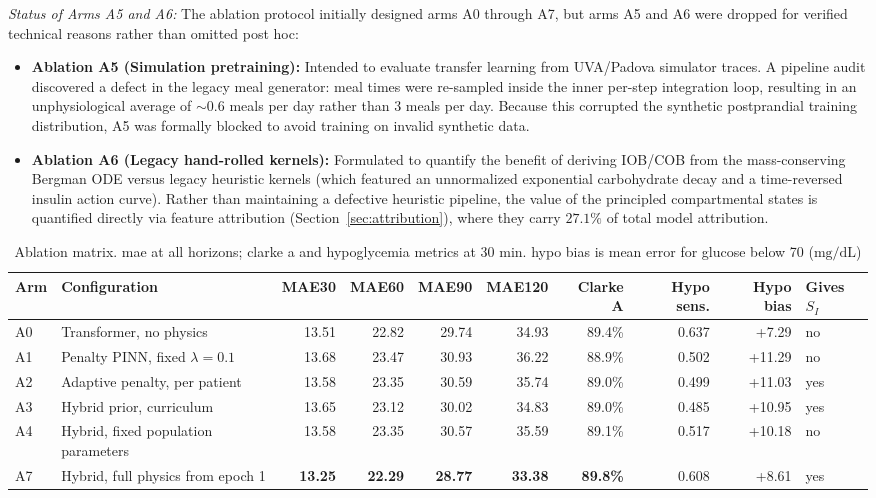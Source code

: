 \documentclass[journal]{IEEEtran}
\begin{document}
\textit{Status of Arms A5 and A6:} The ablation protocol initially designed arms A0 through A7, but arms A5 and A6 were dropped for verified technical reasons rather than omitted post hoc:
\begin{itemize}
    \item \textbf{Ablation A5 (Simulation pretraining):} Intended to evaluate transfer learning from UVA/Padova simulator traces. A pipeline audit discovered a defect in the legacy meal generator: meal times were re-sampled inside the inner per-step integration loop, resulting in an unphysiological average of $\sim 0.6$ meals per day rather than $3$ meals per day. Because this corrupted the synthetic postprandial training distribution, A5 was formally blocked to avoid training on invalid synthetic data.
    \item \textbf{Ablation A6 (Legacy hand-rolled kernels):} Formulated to quantify the benefit of deriving IOB/COB from the mass-conserving Bergman ODE versus legacy heuristic kernels (which featured an unnormalized exponential carbohydrate decay and a time-reversed insulin action curve). Rather than maintaining a defective heuristic pipeline, the value of the principled compartmental states is quantified directly via feature attribution (Section~\ref{sec:attribution}), where they carry $27.1\%$ of total model attribution.
\end{itemize}


\begin{table}[t]
\centering

\caption{Ablation matrix. mae at all horizons; clarke a and hypoglycemia metrics at 30 min. hypo bias is mean error for glucose below 70 ($\mathrm{mg/dL}$)}
\label{tab:ablation}
\footnotesize
\setlength{\tabcolsep}{4.5pt}
\begin{tabular}{llrrrrrrrl}
\toprule
Arm & Configuration & MAE30 & MAE60 & MAE90 & MAE120 & Clarke A & Hypo sens. & Hypo bias & Gives $S_I$ \\
\midrule
A0 & Transformer, no physics & 13.51 & 22.82 & 29.74 & 34.93 & 89.4\% & 0.637 & +7.29 & no \\
A1 & Penalty PINN, fixed $\lambda=0.1$ & 13.68 & 23.47 & 30.93 & 36.22 & 88.9\% & 0.502 & +11.29 & no \\
A2 & Adaptive penalty, per patient & 13.58 & 23.35 & 30.59 & 35.74 & 89.0\% & 0.499 & +11.03 & yes \\
A3 & Hybrid prior, curriculum & 13.65 & 23.12 & 30.02 & 34.83 & 89.0\% & 0.485 & +10.95 & yes \\
A4 & Hybrid, fixed population parameters & 13.58 & 23.35 & 30.57 & 35.59 & 89.1\% & 0.517 & +10.18 & no \\
A7 & Hybrid, full physics from epoch 1 & \textbf{13.25} & \textbf{22.29} & \textbf{28.77} & \textbf{33.38} & \textbf{89.8\%} & 0.608 & +8.61 & yes \\
\bottomrule
\end{tabular}
\end{table}
\end{document}
